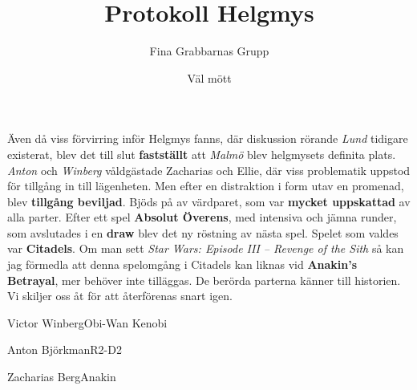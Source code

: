 \documentclass{fgg}
\title{Protokoll Helgmys}
\author{Fina Grabbarnas Grupp}
\date{\formatdate{14}{11}{2020}}
\begin{document}
\makehf
\maketitle

\begin{narvaro}
\end{narvaro}

\begin{protokoll}
	Även då viss förvirring inför Helgmys fanns, där diskussion rörande \emph{Lund} tidigare existerat, blev det till slut \textbf{fastställt} att \emph{Malmö} blev helgmysets definita plats.
	\emph{Anton} och \emph{Winberg} våldgästade Zacharias och Ellie, där viss problematik uppstod för tillgång in till lägenheten. Men efter en distraktion i form utav en promenad, blev \textbf{tillgång beviljad}.
	Bjöds på av värdparet, som var \textbf{mycket uppskattad} av alla parter.
	Efter ett spel \textbf{Absolut Överens}, med intensiva och jämna runder, som avslutades i en \textbf{draw} blev det ny röstning av nästa spel. Spelet som valdes var \textbf{Citadels}. Om man sett \emph{Star Wars: Episode III – Revenge of the Sith} så kan jag förmedla att denna spelomgång i Citadels kan liknas vid \textbf{Anakin's Betrayal}, mer behöver inte tilläggas. De berörda parterna känner till historien.
	Vi skiljer oss åt för att återförenas snart igen.
\end{protokoll}

\signature{Väl mött}{Victor Winberg}{Obi-Wan Kenobi}
\signature{}{Anton Björkman}{R2-D2}
\signature{}{Zacharias Berg}{Anakin}
\end{document}
